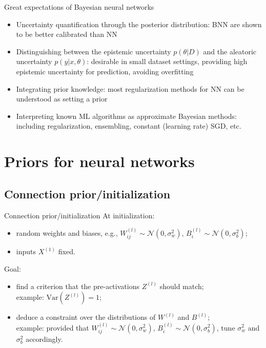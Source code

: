 \documentclass[9pt]{beamer}
\begin{document}
\begin{frame}{Great expectations of Bayesian neural networks}
\begin{itemize}
	\item Uncertainty quantification through the posterior distribution: BNN are shown to be better calibrated than NN
	\item Distinguishing between the epistemic uncertainty $p(\theta|D)$ and the aleatoric uncertainty $p(y|x,\theta)$: desirable in small dataset settings, providing high epistemic uncertainty for prediction, avoiding overfitting
	\item Integrating prior knowledge: most regularization methods for NN can be understood as setting a prior
	\item Interpreting known ML algorithms as approximate Bayesian methods: including regularization, ensembling, constant (learning rate) SGD, etc. 
\end{itemize}
\end{frame}


\section{Priors for neural networks}

\subsection{Connection prior/initialization}

\begin{frame}{Connection prior/initialization}
	\alert{At initialization:}
	\begin{itemize}
		\item random weights and biases, e.g., $W^{(l)}_{ij} \sim \mathcal{N}(0, \sigma_w^2)$, 
		$B^{(l)}_{i} \sim \mathcal{N}(0, \sigma_b^2)$;
		\item inputs $X^{(1)}$ fixed.
	\end{itemize} 

	\bigskip
	
	\alert{Goal:}
	\begin{itemize}
		\item find a criterion that the pre-activations $Z^{(l)}$ should match;  \\
			example: $\mathrm{Var}(Z^{(l)}) = 1$;  
		\item deduce a constraint over the distributions of $W^{(l)}$ and $B^{(l)}$;  \\
			example: provided that $W^{(l)}_{ij} \sim \mathcal{N}(0, \sigma_w^2)$, 
			$B^{(l)}_{i} \sim \mathcal{N}(0, \sigma_b^2)$, tune $\sigma_w^2$ and $\sigma_b^2$ accordingly.
	\end{itemize} 
\end{frame}
\end{document}
